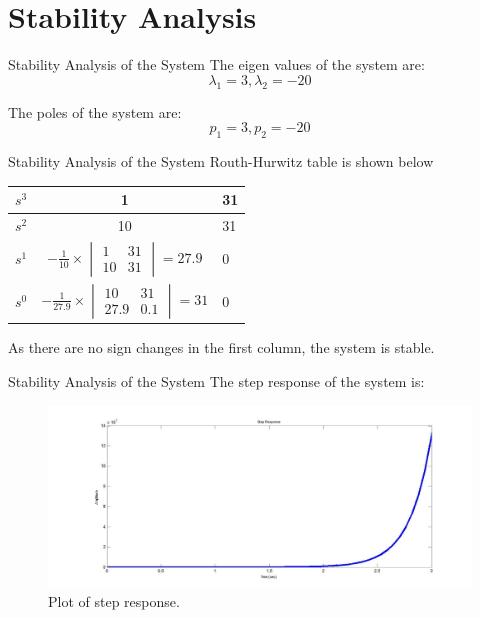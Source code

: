 \documentclass[10pt,compress,mathserif]{beamer}
\begin{document}
\section{Stability Analysis}
\begin{frame}{Stability Analysis of the System}
The eigen values of the system are:
\begin{equation} \lambda_1 = 3,  \lambda_2 = -20 \end{equation} \vskip10pt

The poles of the system are:
\begin{equation} p_1 = 3,  p_2 = -20 \end{equation} \vskip10pt

\end{frame}

\begin{frame}{Stability Analysis of the System}
Routh-Hurwitz table is shown below
\begin{table}[h] \begin{center}
\begin{tabular}{|l|c|l|} \hline
$s^3$  & 1 & 31 \\ \hline
$s^2$  & 10 & 31 \\ \hline
$s^1$  & $-\frac{1}{10}\times\begin{vmatrix} 1 & 31\\ 10 & 31 \end{vmatrix}=27.9$ & 0 \\
$s^0$  & $-\frac{1}{27.9}\times\begin{vmatrix} 10 & 31\\ 27.9 & 0.1 \end{vmatrix}=31$ & 0 \\ \hline
\end{tabular} \end{center}
\end{table}

As there are no sign changes in the first column, the system is stable.


\end{frame}


\begin{frame}{Stability Analysis of the System}
The step response of the system is:
\begin{figure}[h!]
\centering
\includegraphics[scale=0.2]{Step_Res.jpg}
\caption{Plot of step response.}
\end{figure}
\end{frame}
\end{document}
